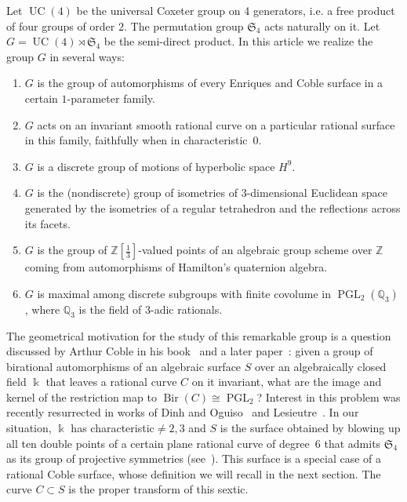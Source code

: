 \documentclass[11pt]{article}
\theoremstyle{definition}
\numberwithin{equation}{section}
\numberwithin{figure}{section}
\numberwithin{table}{section}
\newcommand*\sset{\subset}
\newcommand{\bbQ}{{\mathbb{Q}}}
\newcommand{\bbZ}{{\mathbb{Z}}}
\DeclareMathOperator{\PGL}{PGL}
\DeclareMathOperator{\UC}{UC}
\DeclareMathOperator{\Bir}{Bir}
\newcommand{\frakS}{\mathfrak{S}}
\begin{document}
Let $\UC(4)$ be the universal Coxeter group on 4 generators, i.e. a free product of four groups of order $2$. The permutation group $\frakS_4$ acts naturally on it. Let $G = \UC(4)\rtimes \frakS_4$ be the semi-direct product. In this article we realize the group $G$ in several ways:
\begin{enumerate}
\item \label{list1.1}$G$ is the group of automorphisms of every Enriques and Coble surface in a certain $1$-parameter family.
\item \label{list1.2}$G$ acts on an invariant smooth rational curve on a particular rational surface in this family, faithfully when in characteristic~$0$.
\item \label{list1.3}$G$ is a discrete group of motions of hyperbolic space $H^9$.
\item \label{list1.4}$G$ is the (nondiscrete) group of isometries of $3$-dimensional Euclidean space generated by the isometries of a regular tetrahedron and the reflections across its facets.
\item \label{list1.5}$G$ is the group of $\bbZ[\frac13]$-valued points of an algebraic group scheme over $\bbZ$ coming from automorphisms of Hamilton's quaternion algebra.
\item \label{list1.6}$G$ is maximal among discrete subgroups with finite covolume in $\PGL_2({\bbQ}_3)$, where ${\bbQ}_3$ is the field of $3$-adic rationals.
\end{enumerate}

The geometrical motivation for the study of this remarkable group is a question discussed by Arthur Coble in his book~\cite[p.~226--227]{Coble} and a later paper~\cite{Coble2}: given a group of birational automorphisms of an algebraic surface $S$ over an algebraically closed field $\Bbbk$ that leaves a rational curve $C$ on it invariant, what are the image and kernel of the restriction map to $\Bir(C)\cong \PGL_2$? Interest in this problem was recently resurrected in works of Dinh and Oguiso~\cite{Oguiso} and Lesieutre~\cite{Lesieutre}. In our situation, $\Bbbk$ has characteristic${}\neq2,3$ and $S$ is the surface obtained by blowing up all ten double points of a certain plane rational curve of degree~6 that admits $\frakS_4$ as its group of projective symmetries (see~\cite[Section~5.4]{DolgachevSalem}). This surface is a special case of a rational Coble surface, whose definition we will recall in the next section. The curve $C\sset S$ is the proper transform of this sextic.
\end{document}
